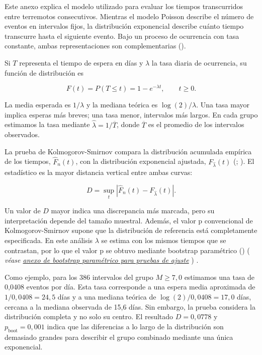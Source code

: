 \documentclass[
  spanish,
  letterpaper,
  DIV=11,
  numbers=noendperiod]{scrartcl}
\newcommand{\asesoriaParenRef}[1]{%
  \textnormal{\textcolor{asesoriaTextColor}{(}}%
  {\hypersetup{linkcolor=asesoriaLinkColor,urlcolor=asesoriaLinkColor,citecolor=asesoriaLinkColor}\textcolor{asesoriaTextColor}{\emph{#1}}}%
  \textnormal{\textcolor{asesoriaTextColor}{)}}%
}
\begin{document}
Este anexo explica el modelo utilizado para evaluar los tiempos
transcurridos entre terremotos consecutivos. Mientras el modelo Poisson
describe el número de eventos en intervalos fijos, la distribución
exponencial describe cuánto tiempo transcurre hasta el siguiente evento.
Bajo un proceso de ocurrencia con tasa constante, ambas representaciones
son complementarias ().

Si \(T\) representa el tiempo de espera en días y \(\lambda\) la tasa
diaria de ocurrencia, su función de distribución es

\[
F(t)=P(T\leq t)=1-e^{-\lambda t},
\qquad t\geq0.
\]

La media esperada es \(1/\lambda\) y la mediana teórica es
\(\log(2)/\lambda\). Una tasa mayor implica esperas más breves; una tasa
menor, intervalos más largos. En cada grupo estimamos la tasa mediante
\(\widehat\lambda=1/\overline T\), donde \(\overline T\) es el promedio
de los intervalos observados.

La prueba de Kolmogorov-Smirnov compara la distribución acumulada
empírica de los tiempos, \(\widehat F_n(t)\), con la distribución
exponencial ajustada, \(F_{\widehat\lambda}(t)\)
(;
). El
estadístico es la mayor distancia vertical entre ambas curvas:

\[
D=\sup_t\left|\widehat F_n(t)-F_{\widehat\lambda}(t)\right|.
\]

Un valor de \(D\) mayor indica una discrepancia más marcada, pero su
interpretación depende del tamaño muestral. Además, el valor p
convencional de Kolmogorov-Smirnov supone que la distribución de
referencia está completamente especificada. En este análisis \(\lambda\)
se estima con los mismos tiempos que se contrastan, por lo que el valor
p se obtuvo mediante bootstrap paramétrico
()
\asesoriaParenRef{véase \hyperref[sec-anexo-bootstrap-parametrico]{anexo de bootstrap paramétrico para pruebas de ajuste}}.

Como ejemplo, para los 386 intervalos del grupo \(M\geq7{,}0\) estimamos
una tasa de 0,0408 eventos por día. Esta tasa corresponde a una espera
media aproximada de \(1/0{,}0408=24{,}5\) días y a una mediana teórica
de \(\log(2)/0{,}0408=17{,}0\) días, cercana a la mediana observada de
15,6 días. Sin embargo, la prueba considera la distribución completa y
no solo su centro. El resultado \(D=0{,}0778\) y
\(p_{\mathrm{boot}}=0{,}001\) indica que las diferencias a lo largo de
la distribución son demasiado grandes para describir el grupo combinado
mediante una única exponencial.
\end{document}
